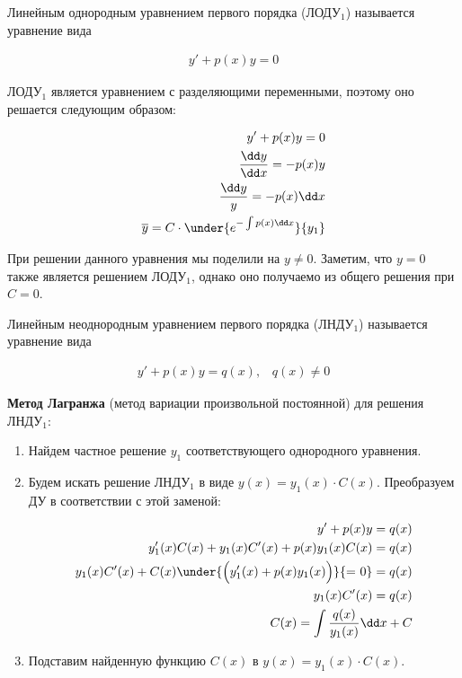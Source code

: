 
\begin{definition}
  Линейным однородным уравнением первого порядка (ЛОДУ\(_1\)) называется
  уравнение вида

  \begin{align*}
    y' + p(x) y = 0
  \end{align*}
\end{definition}

ЛОДУ\(_1\) является уравнением с разделяющими переменными, поэтому оно решается
следующим образом:

\begin{align*}
  y' + p(x) y = 0 \\
  \frac{\dd y}{\dd x} = -p(x) y \\
  \frac{\dd y}{y} = -p(x) \dd x \\
  \overline{y} = C \cdot \under{e^{-\int p(x) \dd x}}{y_1}
\end{align*}

\begin{remark}
  При решении данного уравнения мы поделили на \(y \neq 0\). Заметим, что
  \(y = 0\) также является решением ЛОДУ\(_1\), однако оно получаемо из общего
  решения при \(C = 0\).
\end{remark}
  
\begin{definition}
  Линейным неоднородным уравнением первого порядка (ЛНДУ\(_1\)) называется
  уравнение вида

  \begin{align*}
    y' + p(x) y = q(x), \hspace{10pt} q(x) \neq 0
  \end{align*}
\end{definition}

\textbf{Метод Лагранжа} (метод вариации произвольной постоянной) для решения
ЛНДУ\(_1\):

\begin{enumerate}
  \item Найдем частное решение \(y_{1}\) соответствующего однородного уравнения.
  \item Будем искать решение ЛНДУ\(_1\) в виде \(y(x) = y_{1}(x) \cdot C(x)\).
    Преобразуем ДУ в соответствии с этой заменой:

    \begin{align*}
      y' + p(x) y = q(x) \\
      y_{1}'(x) C(x) + y_{1}(x) C'(x) + p(x) y_{1}(x)  C(x) = q(x) \\
      y_{1}(x) C'(x) + C(x) 
      \under{\Big( y_{1}'(x) + p(x) y_{1}(x) \Big)}{\text{= 0}}
      = q(x) \\
      y_{1}(x) C'(x) = q(x) \\
      C(x) = \int \frac{q(x)}{y_{1}(x)} \dd x + C
    \end{align*}

  \item Подставим найденную функцию \(C(x)\) в \(y(x) = y_{1}(x) \cdot C(x)\).
\end{enumerate}

